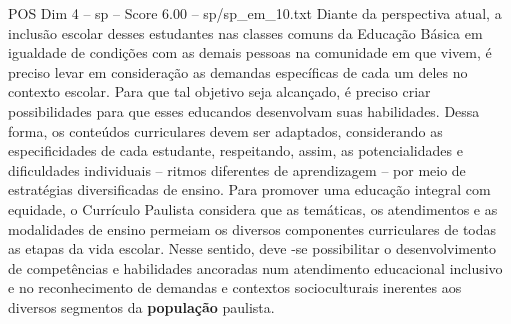 \begin{textsample}{POS Dim 4 – sp – Score 6.00 – sp/sp\_em\_10.txt}
Diante da perspectiva atual, a inclusão escolar desses estudantes nas classes comuns da Educação Básica em igualdade de condições com as demais pessoas na comunidade em que vivem, é preciso levar em consideração as demandas específicas de cada um deles no contexto escolar.
Para que tal objetivo seja alcançado, é preciso criar possibilidades para que esses educandos desenvolvam suas habilidades.
Dessa forma, os conteúdos curriculares devem ser adaptados, considerando as especificidades de cada estudante, respeitando, assim, as potencialidades e dificuldades individuais – ritmos diferentes de aprendizagem – por meio de estratégias diversificadas de ensino.
Para promover uma educação integral com equidade, o Currículo Paulista considera que as temáticas, os atendimentos e as modalidades de ensino permeiam os diversos componentes curriculares de todas as etapas da vida escolar.
Nesse sentido, deve -se possibilitar o desenvolvimento de competências e habilidades ancoradas num atendimento educacional inclusivo e no reconhecimento de demandas e contextos socioculturais inerentes aos diversos segmentos da \textbf{população} paulista.

\end{textsample}
